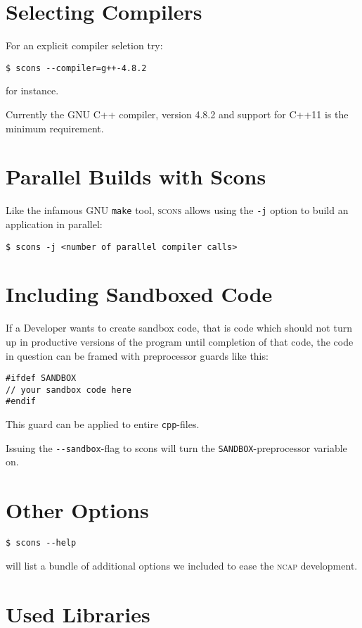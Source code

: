 \section{Selecting Compilers}

For an explicit compiler seletion try:
\begin{lstlisting}[style=shell]
$ scons --compiler=g++-4.8.2
\end{lstlisting}
for instance.

Currently the GNU C++ compiler, version 4.8.2 and support for C++11 is the minimum requirement.

\section{Parallel Builds with Scons}

Like the infamous GNU \verb+make+ tool, \textsc{scons} allows using the \verb+-j+ option to build an application in parallel:  
\begin{lstlisting}[style=shell]
$ scons -j <number of parallel compiler calls>
\end{lstlisting}

\section{Including Sandboxed Code}

If a Developer wants to create sandbox code, that is code which should not turn up in productive versions of the program until completion of that code, the code in question can be framed with preprocessor guards like this:
\begin{lstlisting}[style=C++]
#ifdef SANDBOX
// your sandbox code here
#endif
\end{lstlisting}
This guard can be applied to entire \verb+cpp+-files.

Issuing the \verb+--sandbox+-flag to scons will turn the \verb+SANDBOX+-preprocessor variable on.


\section{Other Options}
\begin{lstlisting}[style=shell]
$ scons --help 
\end{lstlisting}
will list a bundle of additional options we included to ease the \textsc{ncap} development.

\section{Used Libraries}

